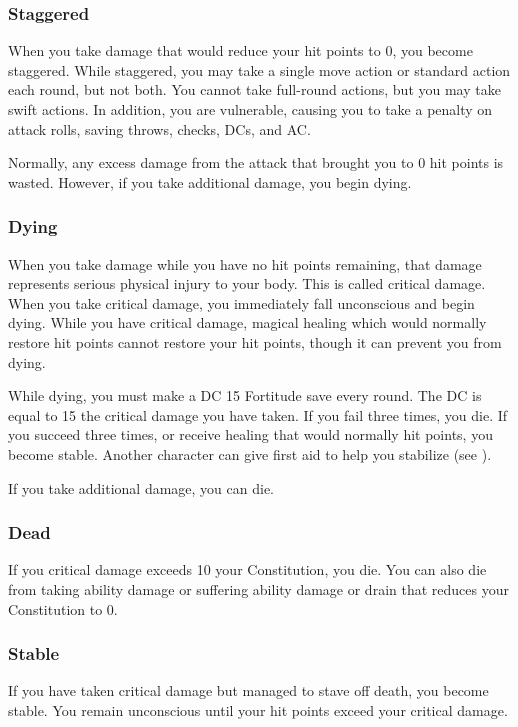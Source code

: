 \subsubsection{Staggered}
When you take damage that would reduce your hit points to 0, you become staggered.  While staggered, you may take a single move action or standard action each round, but not both. You cannot take full-round actions, but you may take swift actions. In addition, you are vulnerable, causing you to take a  penalty on attack rolls, saving throws, checks, DCs, and AC.

Normally, any excess damage from the attack that brought you to 0 hit points is wasted. However, if you take additional damage, you begin dying.

\subsubsection{Dying}
When you take damage while you have no hit points remaining, that damage represents serious physical injury to your body. This is called critical damage. When you take critical damage, you immediately fall unconscious and begin dying. While you have critical damage, magical healing which would normally restore hit points cannot restore your hit points, though it can prevent you from dying.

While dying, you must make a DC 15 Fortitude save every round. The DC is equal to 15 \add the critical damage you have taken. If you fail three times, you die. If you succeed three times, or receive healing that would normally hit points, you become stable. Another character can give first aid to help you stabilize (see ).

If you take additional damage, you can die. 

\subsubsection{Dead}
If you critical damage exceeds 10 \add your Constitution, you die. You can also die from taking ability damage or suffering ability damage or drain that reduces your Constitution to 0.

\subsubsection{Stable}
If you have taken critical damage but managed to stave off death, you become stable. You remain unconscious until your hit points exceed your critical damage.


